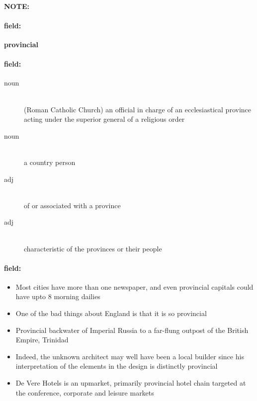 \documentclass[12pt]{article}
\newenvironment{note}{\paragraph{NOTE:}}{}
\newenvironment{field}{\paragraph{field:}}{}
\begin{document}
\begin{note}
\begin{field}
\textbf{\large provincial}
\end{field}


\begin{field}
\begin{description}
\item[noun] \hfill \\ 
(Roman Catholic Church) an official in charge of an ecclesiastical province acting under the superior general of a religious order

\item[noun] \hfill \\ 
a country person

\item[adj] \hfill \\ 
of or associated with a province

\item[adj] \hfill \\ 
characteristic of the provinces or their people

\end{description}
\end{field}

\begin{field}
\begin{itemize}
\item Most cities have more than one newspaper, and even provincial capitals could have upto 8 morning dailies
\item One of the bad things about England is that it is so provincial
\item Provincial backwater of Imperial Russia to a far-flung outpost of the British Empire, Trinidad
\item Indeed, the unknown architect may well have been a local builder since his interpretation of the elements in the design is distinctly provincial
\item De Vere Hotels is an upmarket, primarily provincial hotel chain targeted at the conference, corporate and leisure markets
\end{itemize}
\end{field}
\end{note}
\end{document}
